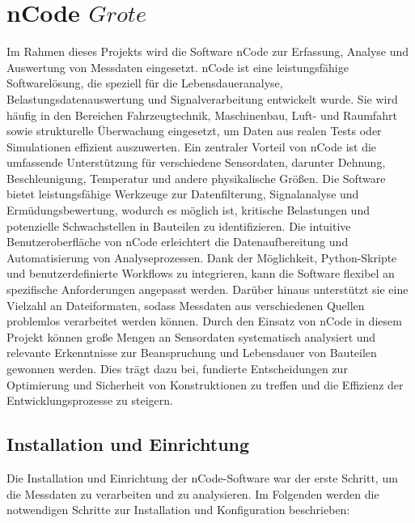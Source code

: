 \section{nCode \(Grote\)}
Im Rahmen dieses Projekts wird die Software nCode zur Erfassung, Analyse und Auswertung von Messdaten eingesetzt. nCode ist eine leistungsfähige Softwarelösung, die speziell für die Lebensdaueranalyse, Belastungsdatenauswertung und Signalverarbeitung entwickelt wurde. Sie wird häufig in den Bereichen Fahrzeugtechnik, Maschinenbau, Luft- und Raumfahrt sowie strukturelle Überwachung eingesetzt, um Daten aus realen Tests oder Simulationen effizient auszuwerten.
Ein zentraler Vorteil von nCode ist die umfassende Unterstützung für verschiedene Sensordaten, darunter Dehnung, Beschleunigung, Temperatur und andere physikalische Größen. Die Software bietet leistungsfähige Werkzeuge zur Datenfilterung, Signalanalyse und Ermüdungsbewertung, wodurch es möglich ist, kritische Belastungen und potenzielle Schwachstellen in Bauteilen zu identifizieren.
Die intuitive Benutzeroberfläche von nCode erleichtert die Datenaufbereitung und Automatisierung von Analyseprozessen. Dank der Möglichkeit, Python-Skripte und benutzerdefinierte Workflows zu integrieren, kann die Software flexibel an spezifische Anforderungen angepasst werden. Darüber hinaus unterstützt sie eine Vielzahl an Dateiformaten, sodass Messdaten aus verschiedenen Quellen problemlos verarbeitet werden können.
Durch den Einsatz von nCode in diesem Projekt können große Mengen an Sensordaten systematisch analysiert und relevante Erkenntnisse zur Beanspruchung und Lebensdauer von Bauteilen gewonnen werden. Dies trägt dazu bei, fundierte Entscheidungen zur Optimierung und Sicherheit von Konstruktionen zu treffen und die Effizienz der Entwicklungsprozesse zu steigern.
\subsection{Installation und Einrichtung}
Die Installation und Einrichtung der nCode-Software war der erste Schritt, um die Messdaten zu verarbeiten und zu analysieren. Im Folgenden werden die notwendigen Schritte zur Installation und Konfiguration beschrieben:

